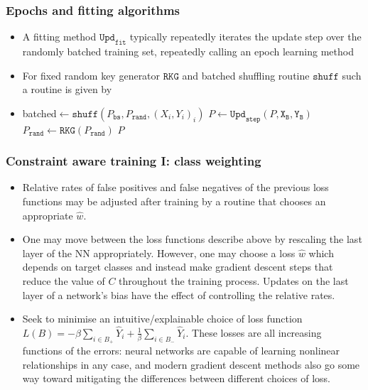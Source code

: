 \documentclass{beamer}
\newcommand{\IN}{{\texttt{X}}}
\newcommand{\OUT}{{\texttt{Y}}}
\newcommand{\PAR}{{\texttt{P}}}
\newcommand{\CO}{{\hat w}}
\newcommand{\BS}{{P_{\texttt{bs}}}}
\newcommand{\RAND}{{\texttt{rand}}}
\newcommand{\SHUFF}{{\texttt{shuff}}}
\newcommand{\RKG}{{\texttt{RKG}}}
\newcommand{\UPDSTEP}{{\texttt{Upd}_{\texttt{step}}}}
\newcommand{\UPDEP}{{\texttt{Upd}_{\texttt{epoch}}}}
\newcommand{\UPDFIT}{{\texttt{Upd}_{\texttt{fit}}}}
\newcommand{\XB}{{\texttt{X}_{\texttt{B}}}}
\newcommand{\YB}{{\texttt{Y}_{\texttt{B}}}}
\begin{document}
\begin{frame}
\frametitle{Epochs and fitting algorithms}
\begin{itemize}
\item
A fitting method $\UPDFIT$ typically repeatedly iterates the update step over the randomly batched training set, repeatedly calling an epoch learning method
\item
   For fixed random key generator $\RKG$ and batched shuffling routine $\SHUFF$
  such a routine is given by
\item
\begin{algorithmic}[0]
  \Function{$\UPDEP$}{$P$,$X$,$Y$}
  \State batched$\gets\SHUFF(\BS,P_\RAND,(X_i,Y_i)_i)$
  \ForAll{$(\XB,\YB)\in$ batched}
  \State $P\gets\UPDSTEP(P,\XB,\YB)$
  \EndFor
  \State $P_\RAND\gets\RKG(P_\RAND)$
  \State\Return $P$
  \EndFunction
\end{algorithmic}
\end{itemize}
\end{frame}
\begin{frame}
\frametitle{Constraint aware training I: class weighting}
\begin{itemize}
\item
  Relative rates of false positives and false negatives of the previous loss functions may be adjusted after training by a routine that chooses an appropriate $\CO$.
\item One may move between the loss functions describe above by rescaling the last layer of the NN appropriately.
  However, one may choose a loss $\CO$ which depends on target classes and instead make gradient descent steps that reduce the value of $C$ throughout the training process.
  Updates on the last layer of a network's bias have the effect of controlling the relative rates.
\item
  Seek to minimise an intuitive/explainable choice of loss function $L(B)=-\beta\sum_{i\in B_+}\hat Y_i+\tfrac1\beta\sum_{i\in B_-}\hat Y_i$.
  These losses are all increasing functions of the errors: neural networks are capable of learning nonlinear relationships in any case, and modern gradient descent methods also go some way toward mitigating the differences between different choices of loss.
\end{itemize}
\end{frame}
\end{document}
